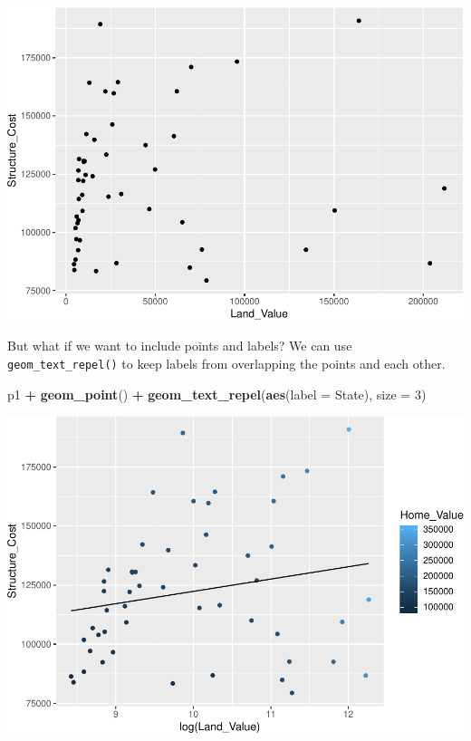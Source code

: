 \documentclass[]{book}
\newenvironment{Shaded}{\begin{snugshade}}{\end{snugshade}}
\newcommand{\DataTypeTok}[1]{\textcolor[rgb]{0.13,0.29,0.53}{#1}}
\newcommand{\DecValTok}[1]{\textcolor[rgb]{0.00,0.00,0.81}{#1}}
\newcommand{\KeywordTok}[1]{\textcolor[rgb]{0.13,0.29,0.53}{\textbf{#1}}}
\newcommand{\NormalTok}[1]{#1}
\newcommand{\OperatorTok}[1]{\textcolor[rgb]{0.81,0.36,0.00}{\textbf{#1}}}
\newcommand{\StringTok}[1]{\textcolor[rgb]{0.31,0.60,0.02}{#1}}
\begin{document}
\includegraphics{R/Rgraphics/figures/unnamed-chunk-147-1.pdf}

But what if we want to include points and labels? We can use \texttt{geom\_text\_repel()} to keep labels from overlapping the points and each other.

\begin{Shaded}
\begin{Highlighting}[]
\NormalTok{p1 }\OperatorTok{+}\StringTok{ }
\StringTok{  }\KeywordTok{geom_point}\NormalTok{() }\OperatorTok{+}\StringTok{ }
\StringTok{  }\KeywordTok{geom_text_repel}\NormalTok{(}\KeywordTok{aes}\NormalTok{(}\DataTypeTok{label =}\NormalTok{ State), }\DataTypeTok{size =} \DecValTok{3}\NormalTok{)}
\end{Highlighting}
\end{Shaded}

\includegraphics{R/Rgraphics/figures/unnamed-chunk-148-1.pdf}
\end{document}

